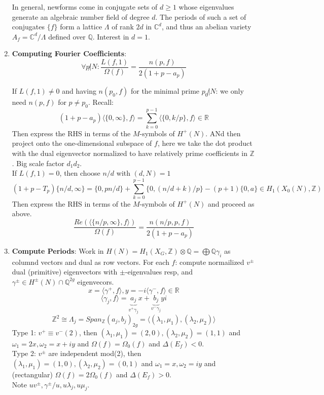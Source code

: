\documentclass{article}
\newcommand{\Q}{\mathbb{Q}}
\newcommand{\R}{\mathbb{R}}
\newcommand{\C}{\mathbb{C}}
\newcommand{\Z}{\mathbb{Z}}
\begin{document}
\begin{multicols}{2}
\begin{enumerate}
In general, newforms come in conjugate sets of $d \geq 1$ whose eigenvalues generate an algebraic number field of degree $d$. The periods of such a set of conjugates $\{f\}$ form a lattice $\Lambda$ of rank $2d$ in $\C^d$, and thus an abelian variety $A_f = \C^d/\Lambda$ defined over $\Q$. Interest in $d = 1$.\\

\item \textbf{Computing Fourier Coefficients}: 
\[\forall p\not|N: \frac{L(f,1)}{\Omega(f)} = \frac{n(p,f)}{2(1+p-a_p)}\]

If $L(f,1) \neq 0$ and having $n(p_0,f)$ for the minimal prime $p_0\not|N$: we only need $n(p,f)$ for $p \neq p_0$. Recall:
\[(1+p-a_p)\langle \{0,\infty\},f\rangle = \sum_{k=0}^{p-1} \langle \{0,k/p\},f\rangle \in \R\]
Then express the RHS in terms of the $M$-symbols of $H^+(N)$. ANd then project onto the one-dimensional subspace of $f$, here we take the dot product with the dual eigenvector normalized to have relatively prime coefficients in $\Z$. Big scale factor $d_1d_2$. \\

If $L(f,1) = 0$, then choose $n/d$ with $(d,N) = 1$
\[(1+p-T_p)\{n/d,\infty\} = \{0,pn/d\} + \sum_{k=0}^{p-1}\{0,(n/d+k)/p\} - (p+1)\{0,a\} \in H_1(X_0(N),\Z)\]
Then express the RHS in terms of the $M$-symbols of $H^+(N)$ and proceed as above. 
\[\frac{Re(\langle \{n/p, \infty\}, f \rangle)}{\Omega(f)} = \frac{n(n/p,p,f)}{2(1+p-a_p)}\]

\item \textbf{Compute Periods}: Work in $H(N) = H_1(X_G,\Z) \otimes \Q = \bigoplus \Q \gamma_i$ as columnd vectors and dual as row vectors. For each $f$: compute normailized $v^\pm$ dual (primitive) eigenvectors with $\pm$-eigenvalues resp, and $\gamma^\pm \in H^\pm(N) \cap \Q^{2g}$ eigenvecors. 
\[x = \langle \gamma^+, f \rangle, y = -i\langle \gamma^-,f\rangle \in \R\]
\[\langle \gamma_j,f \rangle = \underbrace{a_j}_{v^+\gamma_j}x + \underbrace{b_j}_{v^-\gamma_j}yi\]
\[\Z^2 \cong \Lambda_j = Span_\Z(a_j,b_j)_{2g} = \langle (\lambda_1,\mu_1), (\lambda_2,\mu_2) \rangle\]
Type 1: $v^+ \equiv v^- (2)$, then $(\lambda_1,\mu_1) = (2,0), (\lambda_2,\mu_2) = (1,1)$ and $\omega_1 = 2x, \omega_2 = x+iy$ and $\Omega(f) = \Omega_0(f)$ and $\Delta(E_f) < 0$. \\
Type 2: $v^\pm$ are independent mod(2), then $(\lambda_1,\mu_1) = (1,0), (\lambda_2,\mu_2) = (0,1)$ and $\omega_1 = x, \omega_2 = iy$ and (rectangular) $\Omega(f) = 2\Omega_0(f)$ and $\Delta(E_f) > 0$. \\
Note $uv^\pm, \gamma^\pm/u, u\lambda_j, u \mu_j$. \\



\end{enumerate}
\end{multicols}
\end{document}
